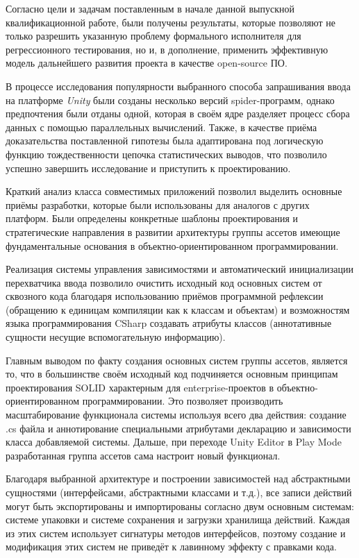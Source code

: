\Conclusion
Согласно цели и задачам поставленным в начале данной выпускной квалификационной работе, были получены результаты, которые позволяют не только разрешить указанную проблему формального исполнителя для регрессионного тестирования, но и, в дополнение, применить эффективную \cite{open_source} модель дальнейшего развития проекта в качестве open-source ПО.

В процессе исследования популярности выбранного способа запрашивания ввода на платформе \textit{Unity} были созданы несколько версий spider-программ, однако предпочтения были отданы одной, которая в своём ядре разделяет процесс сбора данных с помощью параллельных вычислений. Также, в качестве приёма доказательства поставленной гипотезы была адаптирована под логическую функцию тождественности цепочка статистических выводов, что позволило успешно завершить исследование и приступить к проектированию.

Краткий анализ класса совместимых приложений позволил выделить основные приёмы разработки, которые были использованы для аналогов с других платформ. Были определены конкретные шаблоны проектирования и стратегические направления в развитии архитектуры группы ассетов имеющие фундаментальные основания в объектно-ориентированном программировании.

Реализация системы управления зависимостями и автоматический инициализации перехватчика ввода позволило очистить исходный код основных систем от сквозного кода благодаря использованию приёмов программной рефлексии (обращению к единицам компиляции как к классам и объектам) и возможностям языка программирования CSharp создавать атрибуты классов (аннотативные сущности несущие вспомогательную информацию).

Главным выводом по факту создания основных систем группы ассетов, является то, что в большинстве своём исходный код подчиняется основным принципам проектирования SOLID характерным для enterprise-проектов в объектно-ориентированном программировании. Это позволяет производить масштабирование функционала системы используя всего два действия: создание .cs файла и аннотирование специальными атрибутами декларацию и зависимости класса добавляемой системы. Дальше, при переходе Unity Editor в Play Mode разработанная группа ассетов сама настроит новый функционал.

Благодаря выбранной архитектуре и построении зависимостей над абстрактными сущностями (интерфейсами, абстрактными классами и т.д.), все записи действий могут быть экспортированы и импортированы согласно двум основным системам: системе упаковки и системе сохранения и загрузки хранилища действий. Каждая из этих систем использует сигнатуры методов интерфейсов, поэтому создание и модификация этих систем не приведёт к лавинному эффекту с правками кода.

